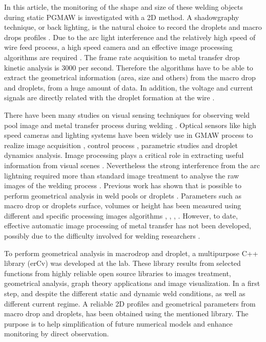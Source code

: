 \documentclass[12pt]{iopart}
\begin{document}
In this article, the monitoring of the shape and size of these welding objects during
static PGMAW  is 
investigated with a 2D method. A shadowgraphy technique, or back lighting,
is the natural choice to record the droplets and macro drops profiles \cite{BALSAMO}.
 Due to the arc light interference and the relatively high 
speed of wire feed process, a high speed camera and an effective image processing algorithms are 
required \cite{WANG}. The  frame rate acquisition to metal transfer drop kinetic analysis is $3000$ 
per second. Therefore the algorithms have to be able to extract 
the geometrical information (area, size and others) from the macro drop and droplets,
from a huge amount of data. In addition, the voltage and current signals are directly related 
with the droplet formation at the wire \cite{BALSAMO}.
 

There have been many studies on visual sensing techniques for observing weld pool 
image \cite{BAE} and metal transfer process during welding \cite{LIN}.
Optical sensors like high speed  cameras and lighting systems have been
widely use in GMAW process to realize  image acquisition \cite{ZHANG4},
control process \cite{BAE}, parametric studies \cite{BALSAMO} and droplet dynamics analysis\cite{LIN}.
Image processing plays a critical role in extracting useful information from visual scenes \cite{WANG}.
Nevertheless the strong interference from the arc lightning required more than standard 
image treatment to analyse the raw images of the welding process \cite{NORDBRUCH}. 
Previous work has shown that is possible to perform geometrical 
analysis in weld pools or droplets \cite{WU1}.
Parameters such as macro drop or droplets surface, volumes 
or height has been measured using different and 
specific processing images algorithms \cite{WANG}, \cite{WU1}, \cite{SEED},
\cite{NORDBRUCH}. However, to date, effective automatic image processing
of metal transfer has not been developed, possibly due to the  difficulty involved 
for welding researchers \cite{WANG}. 

To perform geometrical analysis in macrodrop and droplet,
 a multipurpose C++  library (erCv) was developed at the lab. 
These library results from selected functions  from highly reliable 
open source libraries to images treatment, geometrical 
analysis, graph theory applications and image visualization.
In a first step, and despite the different static and dynamic weld conditions, 
as well as different current regime. A reliable 2D profiles and geometrical
parameters from macro drop and droplets, has been obtained using the mentioned library.
  The purpose is to help simplification of future numerical models and enhance monitoring by direct observation.
     
\end{document}
